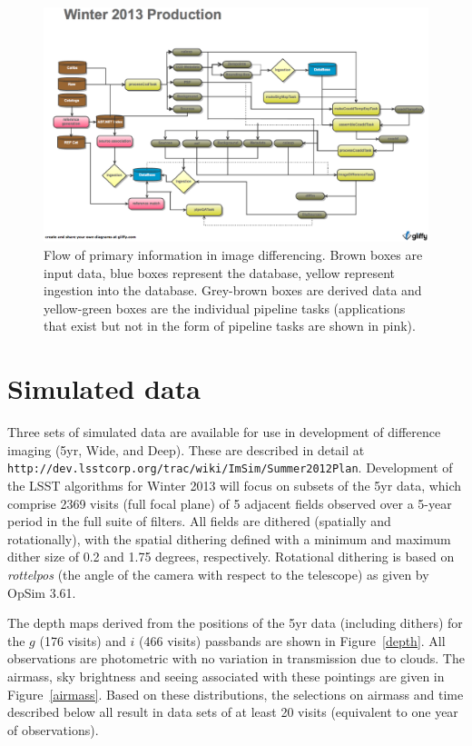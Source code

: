\documentclass[12pt]{article}
\begin{document}
\begin{figure}
\includegraphics[width=\textwidth]{Figures/Winter_2013.eps}
\caption{Flow of primary information in image differencing. Brown
  boxes are input data, blue boxes represent the database, yellow
  represent ingestion into the database. Grey-brown boxes are derived
  data and yellow-green boxes are the individual pipeline tasks (applications
  that exist but not in the form of pipeline tasks are shown in pink).}
\label{flow}
\end{figure}

\clearpage 

\section{Simulated data} 

Three sets of simulated data are available for use in development of
difference imaging (5yr, Wide, and Deep). These are described in
detail at {\tt
  http://dev.lsstcorp.org/trac/wiki/ImSim/Summer2012Plan}.
Development of the LSST algorithms for Winter 2013 will focus on
subsets of the 5yr data, which comprise 2369 visits (full focal plane)
of 5 adjacent fields observed over a 5-year period in the full suite
of filters. All fields are dithered (spatially and rotationally), with the
spatial dithering defined with a minimum and maximum dither size of
0.2 and 1.75 degrees, respectively. Rotational dithering is based on
{\it rottelpos} (the angle of the camera with respect to the
telescope) as given by OpSim 3.61.

The depth maps derived from the positions of the 5yr data (including
dithers) for the $g$ (176 visits) and $i$ (466 visits) passbands are
shown in Figure~\ref{depth}. All observations are photometric with no
variation in transmission due to clouds. The airmass, sky brightness
and seeing associated with these pointings are given in
Figure~\ref{airmass}. Based on these distributions, the selections on
airmass and time described below all result in data sets of at least
20 visits (equivalent to one year of observations).
\end{document}
